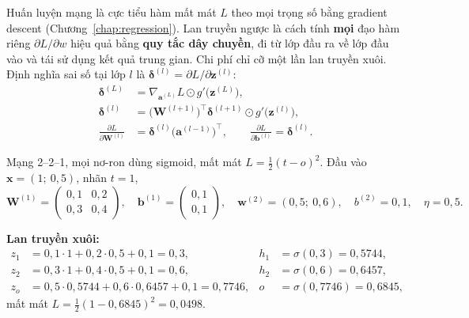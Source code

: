 Huấn luyện mạng là cực tiểu hàm mất mát $L$ theo mọi trọng số bằng gradient descent (Chương~\ref{chap:regression}). Lan truyền ngược là cách tính \textbf{mọi} đạo hàm riêng $\partial L / \partial w$ hiệu quả bằng \textbf{quy tắc dây chuyền}, đi từ lớp đầu ra về lớp đầu vào và tái sử dụng kết quả trung gian. Chi phí chỉ cỡ một lần lan truyền xuôi. Định nghĩa sai số tại lớp $l$ là $\boldsymbol{\delta}^{(l)} = \partial L / \partial \mathbf{z}^{(l)}$:
\begin{align}
    \boldsymbol{\delta}^{(L)} &= \nabla_{\mathbf{a}^{(L)}} L \odot g'\big(\mathbf{z}^{(L)}\big), \\
    \boldsymbol{\delta}^{(l)} &= \big(\mathbf{W}^{(l+1)}\big)^{\top}\boldsymbol{\delta}^{(l+1)} \odot g'\big(\mathbf{z}^{(l)}\big), \\
    \frac{\partial L}{\partial \mathbf{W}^{(l)}} &= \boldsymbol{\delta}^{(l)}\big(\mathbf{a}^{(l-1)}\big)^{\top}, \qquad
    \frac{\partial L}{\partial \mathbf{b}^{(l)}} = \boldsymbol{\delta}^{(l)} .
\end{align}

\begin{example}
Mạng 2--2--1, mọi nơ-ron dùng sigmoid, mất mát $L = \frac{1}{2}(t - o)^2$. Đầu vào $\mathbf{x} = (1;\ 0{,}5)$, nhãn $t = 1$,
\[
    \mathbf{W}^{(1)} = \begin{pmatrix} 0{,}1 & 0{,}2 \\ 0{,}3 & 0{,}4 \end{pmatrix}, \quad \mathbf{b}^{(1)} = \begin{pmatrix} 0{,}1 \\ 0{,}1 \end{pmatrix}, \quad
    \mathbf{w}^{(2)} = (0{,}5;\ 0{,}6), \quad b^{(2)} = 0{,}1, \quad \eta = 0{,}5 .
\]
\end{example}

\noindent\textbf{Lan truyền xuôi:}
\begin{align*}
    z_1 &= 0{,}1 \cdot 1 + 0{,}2 \cdot 0{,}5 + 0{,}1 = 0{,}3, & h_1 &= \sigma(0{,}3) = 0{,}5744, \\
    z_2 &= 0{,}3 \cdot 1 + 0{,}4 \cdot 0{,}5 + 0{,}1 = 0{,}6, & h_2 &= \sigma(0{,}6) = 0{,}6457, \\
    z_o &= 0{,}5 \cdot 0{,}5744 + 0{,}6 \cdot 0{,}6457 + 0{,}1 = 0{,}7746, & o &= \sigma(0{,}7746) = 0{,}6845,
\end{align*}
mất mát $L = \frac{1}{2}(1 - 0{,}6845)^2 = 0{,}0498$.

